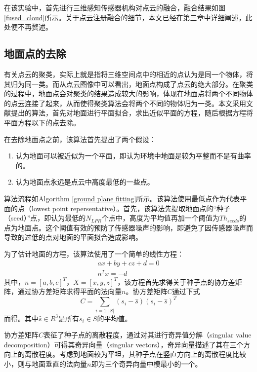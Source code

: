 在该实验中，首先进行三维感知传感器机构对点云的融合，融合结果如图\ref{fused_cloud}所示。关于点云注册融合的细节，本文已经在第三章中详细阐述，此处便不再赘述。

\subsection{地面点的去除}
有关点云的聚类，实际上就是指将三维空间点中的相近的点认为是同一个物体，将其归为同一类。而从点云图像中可以看出，地面点构成了点云的绝大部分。在聚类的过程中，地面点会对聚类的结果造成较大的影响，体现在地面点将两个不同物体的点云连接了起来，从而使得聚类算法会将两个不同的物体归为一类。本文采用文献提出的算法，首先对地面进行平面拟合，求出近似平面的方程，随后根据方程将平面方程以下的点去除。

在去除地面点之前，该算法首先提出了两个假设：
\begin{enumerate}
    \item 认为地面可以被近似为一个平面，即认为环境中地面是较为平整而不是有曲率的。
    \item 认为地面点永远是点云中高度最低的一些点。
\end{enumerate}

算法流程如Algorithm \ref{ground plane fitting}所示。该算法使用最低点作为代表平面的点（lowest point repersentative）。首先，该算法先提取地面点的“种子（seed）”点，即认为最低的$N_{LPR}$个点中，高度为平均值再加一个阈值为$Th_{seeds}$的点为地面点。这个阈值有效的预防了传感器噪声的影响，即避免了因传感器噪声而导致的过低的点对地面的平面拟合造成影响。

为了估计地面的方程，该算法使用了一个简单的线性方程：
\begin{equation}
    \label{eq:plane}
    \begin{split}
        ax + by + cz + d = 0 \\
        n^Tx = -d
    \end{split}
\end{equation}
其中，$n=[a, b, c]^T$，$X=[x, y, z]^T$，该方程首先求得关于种子点的协方差矩阵，通过协方差矩阵求得平面的法向量$n$。协方差矩阵$C$通过下式
\begin{equation}
    C = \sum_{i=1:|S|}{(s_i - \hat{s})(s_i - \hat{s})^T}
\end{equation}
而得。其中$\hat{s} \in R^3$是所有$s_i \in S$的平均值。

协方差矩阵$C$表征了种子点的离散程度，通过对其进行奇异值分解（singular value decomposition）可得其奇异向量（singular vectors），奇异向量描述了其在三个方向上的离散程度。考虑到地面较为平坦，其种子点在竖直方向上的离散程度比较小，则与地面垂直的法向量$n$即为三个奇异向量中模最小的一个。



